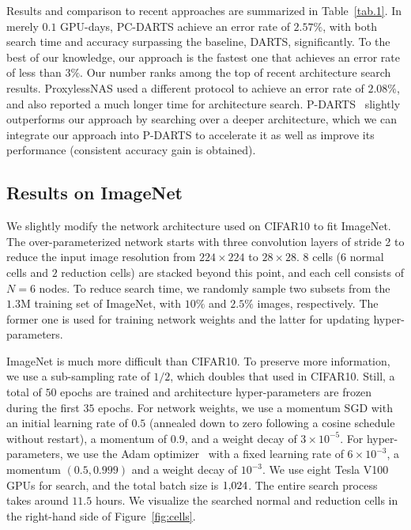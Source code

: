 \documentclass{article} \usepackage{iclr2020_conference,times}
\begin{document}
Results and comparison to recent approaches are summarized in Table~\ref{tab.1}. In merely $0.1$ GPU-days, PC-DARTS achieve an error rate of $2.57\%$, with both search time and accuracy surpassing the baseline, DARTS, significantly. To the best of our knowledge, our approach is the fastest one that achieves an error rate of less than $3\%$. Our number ranks among the top of recent architecture search results. ProxylessNAS used a different protocol to achieve an error rate of $2.08\%$, and also reported a much longer time for architecture search. P-DARTS~\citep{chen2019progressive} slightly outperforms our approach by searching over a deeper architecture, which we can integrate our approach into P-DARTS to accelerate it as well as improve its performance (consistent accuracy gain is obtained).



\subsection{Results on ImageNet}
\label{Experiments:ImageNet}

We slightly modify the network architecture used on CIFAR10 to fit ImageNet. The over-parameterized network starts with three convolution layers of stride 2 to reduce the input image resolution from $224\times224$ to $28\times28$. $8$ cells ($6$ normal cells and $2$ reduction cells) are stacked beyond this point, and each cell consists of ${N}={6}$ nodes. To reduce search time, we randomly sample two subsets from the $1.3\mathrm{M}$ training set of ImageNet, with $10\%$ and $2.5\%$ images, respectively. The former one is used for training network weights and the latter for updating hyper-parameters.

ImageNet is much more difficult than CIFAR10. To preserve more information, we use a sub-sampling rate of $1/2$, which doubles that used in CIFAR10. Still, a total of $50$ epochs are trained and architecture hyper-parameters are frozen during the first $35$ epochs. For network weights, we use a momentum SGD with an initial learning rate of $0.5$ (annealed down to zero following a cosine schedule without restart), a momentum of $0.9$, and a weight decay of $3\times10^{-5}$. For hyper-parameters, we use the Adam optimizer~\citep{kingma2014adam} with a fixed learning rate of $6\times10^{-3}$, a momentum $(0.5,0.999)$ and a weight decay of $10^{-3}$. We use eight Tesla V100 GPUs for search, and the total batch size is $1\rm{,}024$. The entire search process takes around $11.5$ hours. We visualize the searched normal and reduction cells in the right-hand side of Figure~\ref{fig:cells}.
\end{document}
